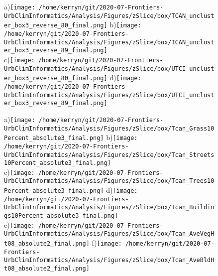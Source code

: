 \documentclass{article}
\begin{document}
%
%
\begin{figure}   %
\centering 
{\tiny a)}\texttt{[image: /home/kerryn/git/2020-07-Frontiers-UrbClimInformatics/Analysis/Figures/zSlice/box/TCAN\_uncluster\_box3\_reverse\_80\_final.png]}   
{\tiny b)}\texttt{[image: /home/kerryn/git/2020-07-Frontiers-UrbClimInformatics/Analysis/Figures/zSlice/box/TCAN\_uncluster\_box3\_reverse\_89\_final.png]}
\\
{\tiny c)}\texttt{[image: /home/kerryn/git/2020-07-Frontiers-UrbClimInformatics/Analysis/Figures/zSlice/box/UTCI\_uncluster\_box3\_reverse\_80\_final.png]}   
{\tiny d)}\texttt{[image: /home/kerryn/git/2020-07-Frontiers-UrbClimInformatics/Analysis/Figures/zSlice/box/UTCI\_uncluster\_box3\_reverse\_89\_final.png]}
\end{figure} 
\clearpage















\begin{figure}           %
\centering    
{\tiny a)}\texttt{[image: /home/kerryn/git/2020-07-Frontiers-UrbClimInformatics/Analysis/Figures/zSlice/box/Tcan\_Grass10Percent\_absolute3\_final.png]}
{\tiny b)}\texttt{[image: /home/kerryn/git/2020-07-Frontiers-UrbClimInformatics/Analysis/Figures/zSlice/box/Tcan\_Streets10Percent\_absolute3\_final.png]}\\
{\tiny c)}\texttt{[image: /home/kerryn/git/2020-07-Frontiers-UrbClimInformatics/Analysis/Figures/zSlice/box/Tcan\_Trees10Percent\_absolute3\_final.png]}
{\tiny d)}\texttt{[image: /home/kerryn/git/2020-07-Frontiers-UrbClimInformatics/Analysis/Figures/zSlice/box/Tcan\_Buildings10Percent\_absolute3\_final.png]}\\
{\tiny e)}\texttt{[image: /home/kerryn/git/2020-07-Frontiers-UrbClimInformatics/Analysis/Figures/zSlice/box/Tcan\_AveVegHt08\_absolute2\_final.png]}
{\tiny f)}\texttt{[image: /home/kerryn/git/2020-07-Frontiers-UrbClimInformatics/Analysis/Figures/zSlice/box/Tcan\_AveBldHt08\_absolute2\_final.png]}
\end{figure} 
\clearpage
\end{document}

